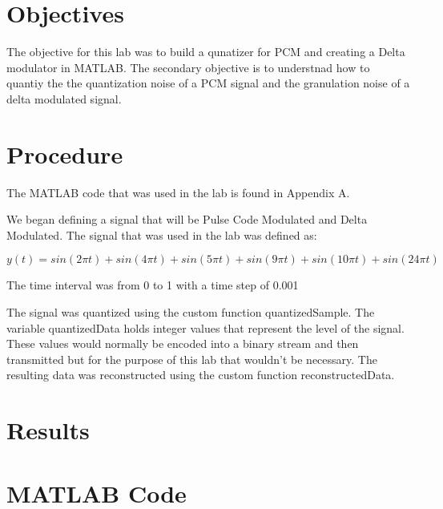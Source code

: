 \documentclass{article}
\begin{document}
\section{Objectives}

\indent
The objective for this lab was to build a qunatizer for PCM and creating a Delta
modulator in MATLAB. The secondary objective is to understnad how to quantiy the
the quantization noise of a PCM signal and the granulation noise of a delta
modulated signal.


\section{Procedure}

The MATLAB code that was used in the lab is found in Appendix A.

We began defining a signal that will be Pulse Code Modulated and Delta Modulated.
The signal that was used in the lab was defined as:

\begin{center}
$
y(t) = sin(2 \pi t) + sin(4 \pi t) +sin(5 \pi t) +sin(9 \pi t) +sin(10 \pi t) +sin(24 \pi t)
$
\end{center}

\noindent
The time interval was from 0 to 1 with a time step of 0.001\\
\noindent

The signal was quantized using the custom function quantizedSample.
The variable quantizedData holds integer values that represent the level of the signal.
These values would normally be encoded into a binary stream and then transmitted but
for the purpose of this lab that wouldn't be necessary.
\noindent
The resulting data was reconstructed using the custom function reconstructedData.





\section{Results}


\appendix
\section{MATLAB Code}
\end{document}
